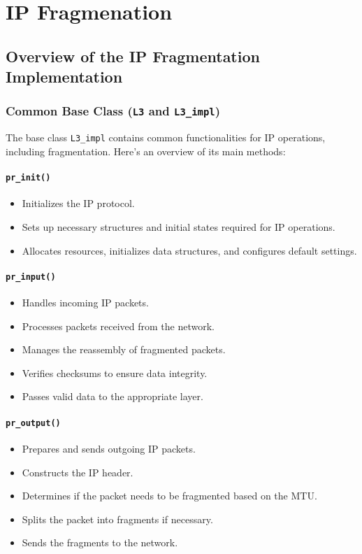 \chapter{IP Fragmenation}
\section{Overview of the IP Fragmentation Implementation}

\subsection{Common Base Class (\texttt{L3} and \texttt{L3\_impl})}
The base class \texttt{L3\_impl} contains common functionalities for IP operations, including fragmentation. Here's an overview of its main methods:

\subsubsection{\texttt{\large pr\_init()}}
\begin{itemize}
    \item Initializes the IP protocol.
    \item Sets up necessary structures and initial states required for IP operations.
    \item Allocates resources, initializes data structures, and configures default settings.
\end{itemize}

\subsubsection{\texttt{\large pr\_input()}}
\begin{itemize}
    \item Handles incoming IP packets.
    \item Processes packets received from the network.
    \item Manages the reassembly of fragmented packets.
    \item Verifies checksums to ensure data integrity.
    \item Passes valid data to the appropriate layer.
\end{itemize}

\subsubsection{\texttt{\large pr\_output()}}
\begin{itemize}
    \item Prepares and sends outgoing IP packets.
    \item Constructs the IP header.
    \item Determines if the packet needs to be fragmented based on the MTU.
    \item Splits the packet into fragments if necessary.
    \item Sends the fragments to the network.
\end{itemize}

